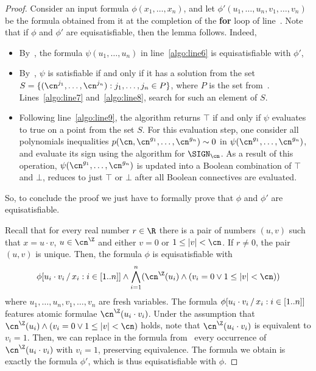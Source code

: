 \begin{proof}
  Consider an input
  formula $\phi(x_1,\dots,x_n)$, and let $\phi'(u_1,\dots,u_n,v_1,\dots,v_n)$ be
  the formula obtained from it at the completion of the \textbf{for} loop of
  line~. Note that if $\phi$ and $\phi'$ are equisatisfiable,
  then the lemma follows. Indeed, 
  \begin{itemize}
    \item By~, the formula $\psi(u_1,\dots,u_n)$ in
    line~\ref{algo:line6} is equisatisfiable with $\phi'$,
    \item By~, $\psi$ is satisfiable if and
    only if it has a solution from the set $S = \{(\cn^{j_1},\dots,\cn^{j_n}) :
    j_1,\dots,j_n \in P\}$, where $P$ is the set from~. 
    Lines~\ref{algo:line7} and~\ref{algo:line8}, 
    search for such an element of $S$.
    \item Following line~\ref{algo:line9}, the algorithm returns $\top$ if and only if $\psi$ evaluates to true
    on a point from the set $S$.
    For this evaluation step, one consider all polynomials inequalities $p(\cn,\cn^{g_1},\dots,\cn^{g_n}) \sim 0$ in $\psi(\cn^{g_1},\dots,\cn^{g_n})$, and evaluate its sign using the algorithm for $\SIGN_{\cn}$. As a result of this operation, $\psi(\cn^{g_1},\dots,\cn^{g_n})$ is updated into a Boolean combination of $\top$ and $\bot$, reduces to just $\top$ or $\bot$ after all Boolean connectives are evaluated.
  \end{itemize}
  So, to conclude the proof we just have to formally prove that $\phi$ and $\phi'$ are equisatisfiable.

  Recall that for every real number $r \in \R$ there is a pair of numbers $(u,v)$ 
  such that $x = u \cdot v$, $u \in \ipow{\cn}$ and either $v = 0$ or $1 \leq \abs{v} < \cn$.
  If $r \neq 0$, the pair $(u,v)$ is unique.
  Then, the formula $\phi$ is equisatisfiable with 
  \begin{equation}
    \label{eq:phi-for-line-1} 
    \phi\sub{u_i \cdot v_i}{x_i : i \in [1..n]} \land \bigwedge_{i=1}^n (\ipow{\cn}(u_i) \land (v_i = 0 \lor 1 \leq \abs{v} < \cn))
  \end{equation}
  where $u_1,\dots,u_n,v_1,\dots,v_n$ are fresh variables. 
  The formula $\phi[u_i \cdot v_i\,/\,x_i : i \in [1..n]]$ features atomic formulae $\ipow{\cn}(u_i \cdot v_i)$. Under the assumption that $\ipow{\cn}(u_i) \land (v_i = 0 \lor 1 \leq \abs{v} < \cn)$ holds, note that $\ipow{\cn}(u_i \cdot v_i)$ is equivalent to $v_i = 1$.
  Then, we can replace in the formula from~ every occurrence of $\ipow{\cn}(u_i \cdot v_i)$ with $v_i = 1$, preserving equivalence. 
  The formula we obtain is exactly the formula $\phi'$, which is thus equisatisfiable with $\phi$.
\end{proof}



